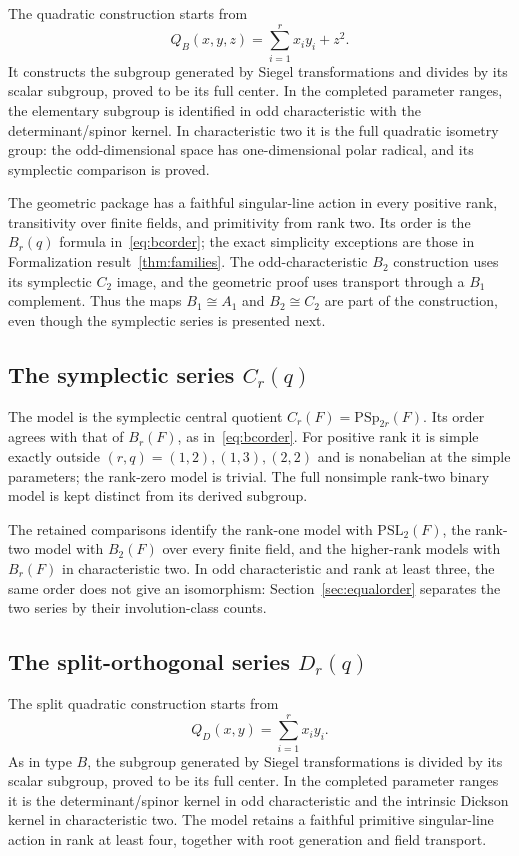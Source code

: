 \documentclass[11pt]{article}
\numberwithin{equation}{section}
\theoremstyle{definition}
\newcommand{\PSL}{\mathrm{PSL}}
\newcommand{\PSp}{\mathrm{PSp}}
\begin{document}
The quadratic construction starts from
\[
 Q_B(x,y,z)=\sum_{i=1}^{r}x_i y_i+z^2.
\]
It constructs the subgroup generated by Siegel transformations and
divides by its scalar subgroup, proved to be its full center. In the
completed parameter ranges, the elementary subgroup is identified in
odd characteristic with the determinant/spinor kernel. In
characteristic two it is the full quadratic isometry group: the
odd-dimensional space has one-dimensional polar radical, and its
symplectic comparison is proved.

The geometric package has a faithful singular-line action in every
positive rank, transitivity over finite fields, and primitivity from
rank two. Its order is the $B_r(q)$ formula in~\eqref{eq:bcorder};
the exact simplicity exceptions are those in Formalization
result~\ref{thm:families}. The odd-characteristic $B_2$ construction
uses its symplectic $C_2$ image, and the geometric proof uses transport
through a $B_1$ complement. Thus the maps $B_1\cong A_1$ and
$B_2\cong C_2$ are part of the construction, even though the
symplectic series is presented next.

\subsection{The symplectic series \texorpdfstring{$C_r(q)$}{Cr(q)}}\label{sec:type-c}

The model is the symplectic central quotient $C_r(F)=\PSp_{2r}(F)$.
Its order agrees with that of $B_r(F)$, as in~\eqref{eq:bcorder}.
For positive rank it is simple exactly outside
$(r,q)=(1,2),(1,3),(2,2)$ and is nonabelian at the simple parameters;
the rank-zero model is trivial. The full nonsimple rank-two binary
model is kept distinct from its derived subgroup.

The retained comparisons identify the rank-one model with
$\PSL_2(F)$, the rank-two model with $B_2(F)$ over every finite
field, and the higher-rank models with $B_r(F)$ in characteristic
two. In odd characteristic and rank at least three, the same order
does not give an isomorphism: Section~\ref{sec:equalorder} separates
the two series by their involution-class counts.

\subsection{The split-orthogonal series \texorpdfstring{$D_r(q)$}{Dr(q)}}\label{sec:type-d}

The split quadratic construction starts from
\[
 Q_D(x,y)=\sum_{i=1}^{r}x_i y_i.
\]
As in type $B$, the subgroup generated by Siegel transformations is
divided by its scalar subgroup, proved to be its full center. In the
completed parameter ranges it is the determinant/spinor kernel in
odd characteristic and the intrinsic Dickson kernel in characteristic
two. The model retains a faithful primitive singular-line action in
rank at least four, together with root generation and field transport.
\end{document}
